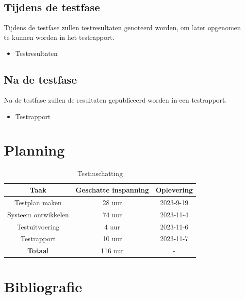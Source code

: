 \documentclass[a4paper]{report}
\begin{document}
\section{Tijdens de testfase}
Tijdens de testfase zullen testresultaten genoteerd worden, om later opgenomen te kunnen worden in het testrapport. 
\begin{itemize}
  \item Testresultaten
\end{itemize}
\section{Na de testfase}
Na de testfase zullen de resultaten gepubliceerd worden in een testrapport. 
\begin{itemize}
    \item Testrapport
\end{itemize}

\chapter{Planning}
\begin{table}[h]
  \centering
  \begin{tabular}{|c|c|c|}
    \hline
    \textbf{Taak} & \textbf{Geschatte inspanning} & \textbf{Oplevering} \\
    \hline
    Testplan maken  & 28 uur & 2023-9-19\\
    \hline
    Systeem ontwikkelen & 74 uur & 2023-11-4 \\
    \hline
    Testuitvoering  & 4 uur & 2023-11-6 \\
    \hline
    Testrapport & 10 uur & 2023-11-7 \\
    \hline
    \textbf{Totaal} &  116 uur & - \\
    \hline
  \end{tabular}
  \caption{Testinschatting}
\end{table}





\chapter{Bibliografie}
\nocite{*} %
\begingroup
\renewcommand{\chapter}[2]{} %
\renewcommand{\addcontentsline}[3]{} %


\endgroup

\end{document}
